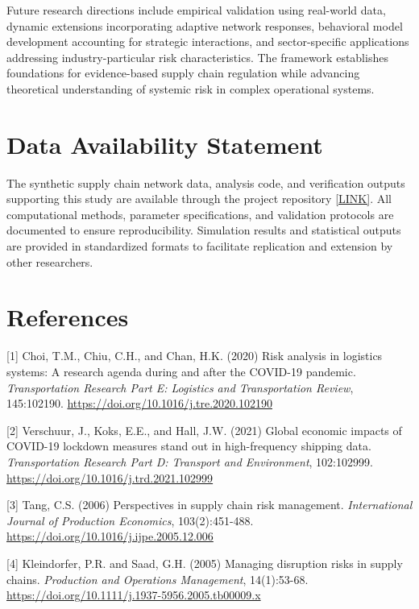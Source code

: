 \documentclass[a4 paper, 11pt,twoside]{article}
\newcommand{\0}{\Bf{0}}
\theoremstyle{definition}
\begin{document}
Future research directions include empirical validation using real-world data, dynamic extensions incorporating adaptive network responses, behavioral model development accounting for strategic interactions, and sector-specific applications addressing industry-particular risk characteristics. The framework establishes foundations for evidence-based supply chain regulation while advancing theoretical understanding of systemic risk in complex operational systems.

\section*{Data Availability Statement}

The synthetic supply chain network data, analysis code, and verification outputs supporting this study are available through the project repository \href{https://github.com/omoshola-o/network_analysis_supply_chain}{[LINK]}. All computational methods, parameter specifications, and validation protocols are documented to ensure reproducibility. Simulation results and statistical outputs are provided in standardized formats to facilitate replication and extension by other researchers.

\section*{References}
\label{ref1}[1] Choi, T.M., Chiu, C.H., and Chan, H.K. (2020) Risk analysis in logistics systems: A research agenda during and after the COVID-19 pandemic. \emph{Transportation Research Part E: Logistics and Transportation Review}, 145:102190. \href{https://doi.org/10.1016/j.tre.2020.102190}{https://doi.org/10.1016/j.tre.2020.102190}

\label{ref2}[2] Verschuur, J., Koks, E.E., and Hall, J.W. (2021) Global economic impacts of COVID-19 lockdown measures stand out in high-frequency shipping data. \emph{Transportation Research Part D: Transport and Environment}, 102:102999. \href{https://doi.org/10.1016/j.trd.2021.102999}{https://doi.org/10.1016/j.trd.2021.102999}


\label{ref3}[3] Tang, C.S. (2006) Perspectives in supply chain risk management. \emph{International Journal of Production Economics}, 103(2):451-488. \href{https://doi.org/10.1016/j.ijpe.2005.12.006}{https://doi.org/10.1016/j.ijpe.2005.12.006}

\label{ref4}[4] Kleindorfer, P.R. and Saad, G.H. (2005) Managing disruption risks in supply chains. \emph{Production and Operations Management}, 14(1):53-68. \href{https://doi.org/10.1111/j.1937-5956.2005.tb00009.x}{https://doi.org/10.1111/j.1937-5956.2005.tb00009.x}
\end{document}
